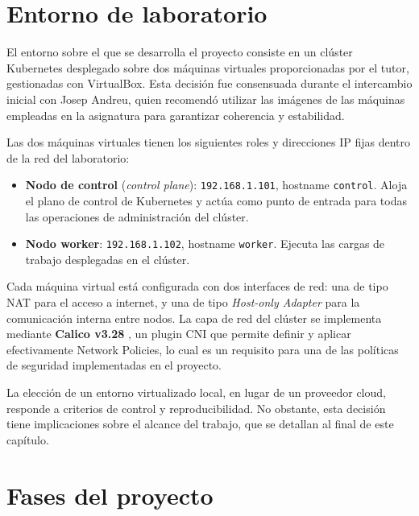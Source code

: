 \section{Entorno de laboratorio}

El entorno sobre el que se desarrolla el proyecto consiste en un clúster Kubernetes desplegado sobre dos máquinas virtuales proporcionadas por el tutor, gestionadas con VirtualBox. Esta decisión fue consensuada durante el intercambio inicial con Josep Andreu, quien recomendó utilizar las imágenes de las máquinas empleadas en la asignatura para garantizar coherencia y estabilidad.

Las dos máquinas virtuales tienen los siguientes roles y direcciones IP fijas dentro de la red del laboratorio:

\begin{itemize}
    \item \textbf{Nodo de control} (\textit{control plane}): \texttt{192.168.1.101}, hostname \texttt{control}. Aloja el plano de control de Kubernetes y actúa como punto de entrada para todas las operaciones de administración del clúster.
    \item \textbf{Nodo worker}: \texttt{192.168.1.102}, hostname \texttt{worker}. Ejecuta las cargas de trabajo desplegadas en el clúster.
\end{itemize}

Cada máquina virtual está configurada con dos interfaces de red: una de tipo NAT para el acceso a internet, y una de tipo \textit{Host-only Adapter} para la comunicación interna entre nodos. La capa de red del clúster se implementa mediante \textbf{Calico v3.28} \cite{calico_docs}, un plugin CNI que permite definir y aplicar efectivamente Network Policies, lo cual es un requisito para una de las políticas de seguridad implementadas en el proyecto.

La elección de un entorno virtualizado local, en lugar de un proveedor cloud, responde a criterios de control y reproducibilidad. No obstante, esta decisión tiene implicaciones sobre el alcance del trabajo, que se detallan al final de este capítulo.

\section{Fases del proyecto}

